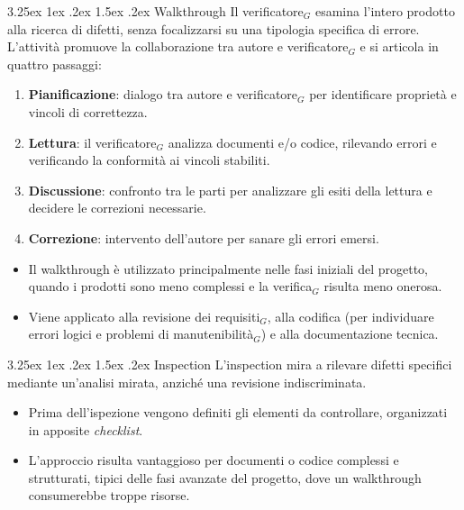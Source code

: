 \documentclass[a4paper, 10pt]{article}
\makeatletter
\renewcommand\paragraph{\@startsection{paragraph}{4}{\z@}%
  {3.25ex \@plus1ex \@minus .2ex}%
  {1.5ex \@plus .2ex}%
  {\normalfont\normalsize\bfseries}}
\makeatother
\begin{document}
\paragraph{Walkthrough}
Il verificatore$_G$ esamina l'intero prodotto alla ricerca di difetti, senza focalizzarsi su una tipologia specifica di errore. L'attività promuove la collaborazione tra autore e verificatore$_G$ e si articola in quattro passaggi:
\begin{enumerate}
    \item \textbf{Pianificazione}: dialogo tra autore e verificatore$_G$ per identificare proprietà e vincoli di correttezza.
    \item \textbf{Lettura}: il verificatore$_G$ analizza documenti e/o codice, rilevando errori e verificando la conformità ai vincoli stabiliti.
    \item \textbf{Discussione}: confronto tra le parti per analizzare gli esiti della lettura e decidere le correzioni necessarie.
    \item \textbf{Correzione}: intervento dell'autore per sanare gli errori emersi.
\end{enumerate}
\begin{itemize}
    \item Il walkthrough è utilizzato principalmente nelle fasi iniziali del progetto, quando i prodotti sono meno complessi e la verifica$_G$ risulta meno onerosa.
    \item Viene applicato alla revisione dei requisiti$_G$, alla codifica (per individuare errori logici e problemi di manutenibilità$_G$) e alla documentazione tecnica.
\end{itemize}

\paragraph{Inspection}
L'inspection mira a rilevare difetti specifici mediante un'analisi mirata, anziché una revisione indiscriminata.
\begin{itemize}
    \item Prima dell'ispezione vengono definiti gli elementi da controllare, organizzati in apposite \emph{checklist}.
    \item L'approccio risulta vantaggioso per documenti o codice complessi e strutturati, tipici delle fasi avanzate del progetto, dove un walkthrough consumerebbe troppe risorse.
\end{itemize}
\end{document}
